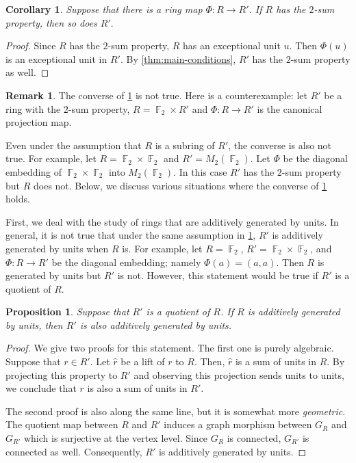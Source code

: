 \documentclass[11pt, a4paper]{amsart}
\newtheorem{prop}[thm]{Proposition}
\newtheorem{cor}[thm]{Corollary}
\theoremstyle{definition}
\newtheorem{rem}[thm]{Remark}
\DeclareMathOperator{\F}{\mathbb{F}}
\numberwithin{equation}{section}
\begin{document}
\begin{cor} \label{cor:2-property-quotient}
    Suppose that there is a ring map $\Phi\colon R \to  R'$. If $R$ has the $2$-sum property, then so does $R'.$ 
\end{cor}
\begin{proof}
Since $R$ has the $2$-sum property, $R$ has an exceptional unit $u.$ Then $\Phi(u)$ is an exceptional unit in $R'.$ By \cref{thm:main-conditions}, $R'$ has the $2$-sum property as well. 
\end{proof}
\begin{rem}
    The converse of \cref{cor:2-property-quotient} is not true. Here is a counterexample: let $R'$ be a ring with the $2$-sum property,  $R=\F_2 \times R'$ and $\Phi\colon  R \to R'$ is the canonical projection map. 


    Even under the assumption that $R$ is a subring of $R'$, the converse is also not true. For example, let $R=\F_2 \times \F_2$ and $R'=M_2(\F_2).$ Let $\Phi$ be the diagonal embedding of $\F_2 \times \F_2$ into $M_2(\F_2).$ In this case $R'$ has the $2$-sum property but $R$ does not. Below, we discuss various situations where the converse of \cref{cor:2-property-quotient} holds. 
\end{rem}
First, we deal with the study of rings that are additively generated by units. In general, it is not true that under the same assumption in \cref{cor:2-property-quotient}, $R'$ is additively generated by units when $R$ is. For example, let $R=\F_2$, $R'=\F_2 \times \F_2$, and $\Phi\colon R \to R'$ be the diagonal embedding; namely $\Phi(a)=(a,a).$ Then $R$ is generated by units but $R'$ is not. However, this statement would be true if $R'$ is a quotient of $R.$

\begin{prop} \label{prop:quotient-generated}
        Suppose that $R'$ is a quotient of $R$. If $R$ is additively generated by units, then $R'$ is also additively generated by units. 

\end{prop}

\begin{proof}
    We give two proofs for this statement. The first one is purely algebraic. Suppose that $r \in R'.$ Let $\widehat{r}$ be a lift of $r$ to $R.$ Then, $\widehat{r}$ is a sum of units in $R.$ By projecting this property to $R'$ and observing this projection sends units to units, we conclude that $r$ is also a sum of units in $R'.$ 

 
The second proof is also along the same line, but it is somewhat more \textit{geometric}. The quotient map between $R$ and $R'$ induces a graph morphism between $G_{R}$ and $G_{R'}$ which is surjective at the vertex level. Since $G_{R}$ is connected, $G_{R'}$ is connected as well. Consequently, $R'$ is additively generated by units. 
\end{proof}
\end{document}
